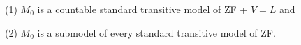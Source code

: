 (1) $M_0$ is a countable standard transitive model of ZF + $V = L$ and

(2) $M_0$ is a submodel of every standard transitive model of ZF.
